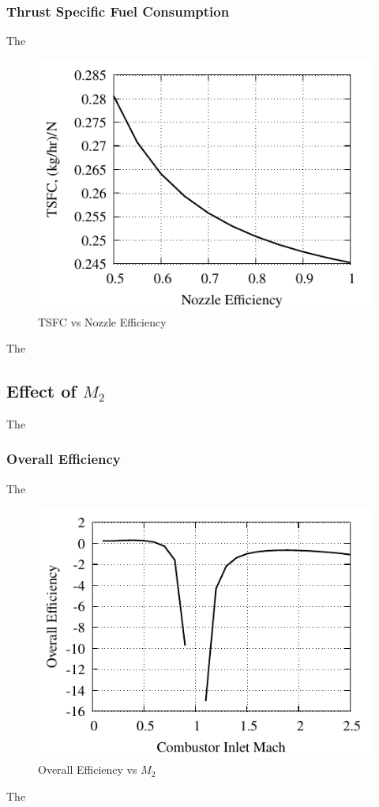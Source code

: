 \documentclass[conf]{new-aiaa} %
\begin{document}
\subsubsection{Thrust Specific Fuel Consumption}
The

\begin{figure}[H] %
    \centering
    \includegraphics[]{media/performance_parameter_files/part_g_TSFC.pdf}
    \caption{\label{fig:partgtsfc}TSFC vs Nozzle Efficiency}
\end{figure}
The

\subsection{Effect of \texorpdfstring{\textit{$M_2$}}{M2}} %
The

\subsubsection{Overall Efficiency}
The

\begin{figure}[H] %
    \centering
    \includegraphics[]{media/performance_parameter_files/part_h_eta_o.pdf}
    \caption{\label{fig:parthetao}Overall Efficiency vs \texorpdfstring{\textit{$M_2$}}{M2}}
\end{figure}
The
\end{document}
